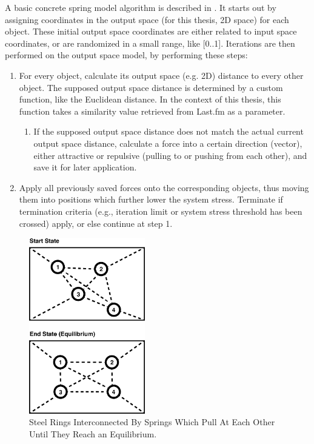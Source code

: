 A basic concrete spring model algorithm is described in \cite{Chalmers:1996:LIT:244979.245035}. It starts out by assigning coordinates in the output space (for this thesis, 2D space) for each object. These initial output space coordinates are either related to input space coordinates, or are randomized in a small range, like [0..1]. Iterations are then performed on the output space model, by performing these steps:

\begin{enumerate}
	\item For every object, calculate its output space (e.g. 2D) distance to every other object. The supposed output space distance is determined by a custom function, like the Euclidean distance. In the context of this thesis, this function takes a similarity value retrieved from Last.fm as a parameter. 
  \begin{enumerate}
  	\item If the supposed output space distance does not match the actual current output space distance, calculate a force into a certain direction (vector), either attractive or repulsive (pulling to or pushing from each other), and save it for later application.
  \end{enumerate}
	\item Apply all previously saved forces onto the corresponding objects, thus moving them into positions which further lower the system stress. Terminate if termination criteria (e.g., iteration limit or system stress threshold has been crossed) apply, or else continue at step 1. 
\end{enumerate}		

\begin{figure}[H]
  \centering
    \includegraphics[width=0.45\textwidth]{figures/spring_model}
  \caption{Steel Rings Interconnected By Springs Which Pull At Each Other Until They Reach an Equilibrium.}
  \label{fig:spring_model}
\end{figure}

